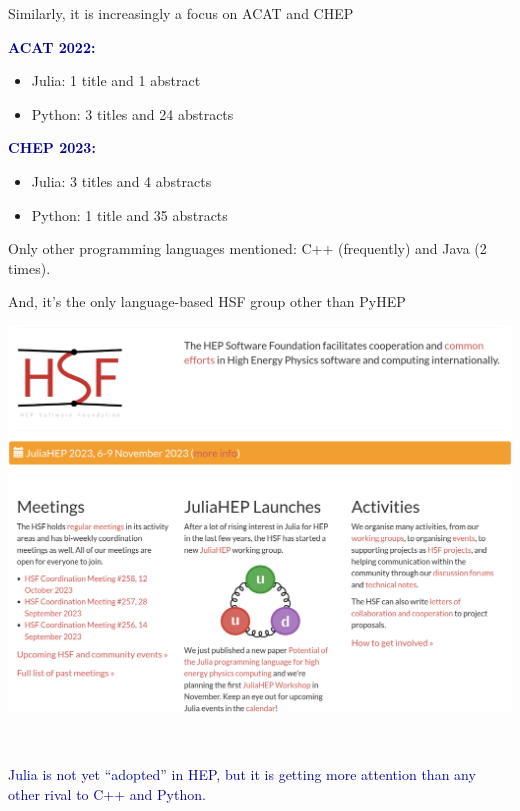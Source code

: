 \documentclass[aspectratio=169]{beamer}
\begin{document}

\begin{frame}{Similarly, it is increasingly a focus on ACAT and CHEP}
\vspace{0.5 cm}

\textcolor{darkblue}{\Large\bf ACAT 2022:}
\begin{itemize}
\item Julia: 1 title and 1 abstract
\item Python: 3 titles and 24 abstracts
\end{itemize}

\vspace{0.5 cm}
\textcolor{darkblue}{\Large\bf CHEP 2023:}
\begin{itemize}
\item Julia: 3 titles and 4 abstracts
\item Python: 1 title and 35 abstracts
\end{itemize}

\vspace{0.5 cm}
Only other programming languages mentioned: C++ (frequently) and Java (2 times).
\end{frame}

\begin{frame}{And, it's the only language-based HSF group other than PyHEP}
\vspace{0.15 cm}
\begin{center}
\includegraphics[width=0.72\linewidth]{juliahep-website.png}
\end{center}
\end{frame}

\begin{frame}{\mbox{ }}
\vspace{0.5 cm}
\LARGE
\begin{center}
\textcolor{darkblue}{Julia is not yet ``adopted'' in HEP, but it is getting more attention than any other rival to C++ and Python.}
\end{center}

\vspace{1 cm}
\begin{center}
\end{center}
\end{frame}
\end{document}
